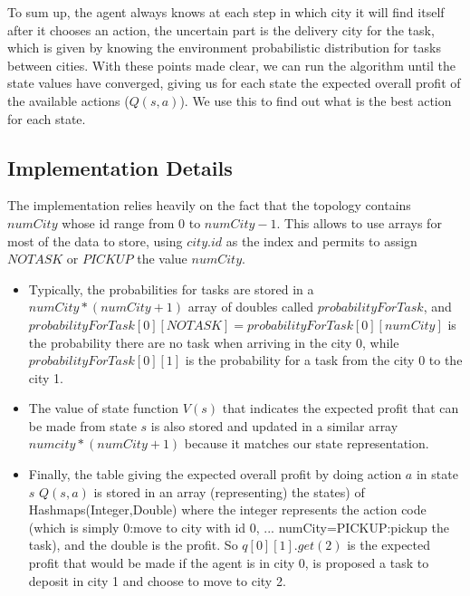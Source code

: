 \documentclass[11pt]{article}
\begin{document}
To sum up, the agent always knows at each step in which city it will find itself after it chooses an action, the uncertain part is the delivery city for the task, which is given by knowing the environment probabilistic distribution for tasks between cities. \newline
With these points made clear, we can run the algorithm until the state values have converged, giving us for each state the expected overall profit of the available actions ($Q(s,a)$). We use this to find out what is the best action for each state.


\subsection{Implementation Details}

The implementation relies heavily on the fact that the topology contains $numCity$ whose id range from 0 to $numCity-1$. This allows to use arrays for most of the data to store, using $city.id$ as the index and permits to assign $NOTASK$ or $PICKUP$ the value $numCity$.
\begin{itemize}
\item Typically, the probabilities for tasks are stored in a $numCity*(numCity+1)$ array of doubles called $probabilityForTask$, and $probabilityForTask[0][NOTASK]=probabilityForTask[0][numCity]$ is the probability there are no task when arriving in the city 0, while $probabilityForTask[0][1]$ is the probability for a task from the city 0 to the city 1.

\item The value of state function $V(s)$ that indicates the expected profit that can be made from state $s$ is also stored and updated in a similar array $numcity*(numCity+1)$ because it matches our state representation.

\item Finally, the table giving the expected overall profit by doing action $a$ in state $s$ $Q(s,a)$ is stored in an array (representing) the states) of Hashmaps(Integer,Double) where the integer represents the action code (which is simply 0:move to city with id 0, ... numCity=PICKUP:pickup the task), and the double is the profit. So $q[0][1].get(2)$ is the expected profit that would be made if the agent is in city 0, is proposed a task to deposit in city 1 and choose to move to city 2.
\end{itemize}
\end{document}
